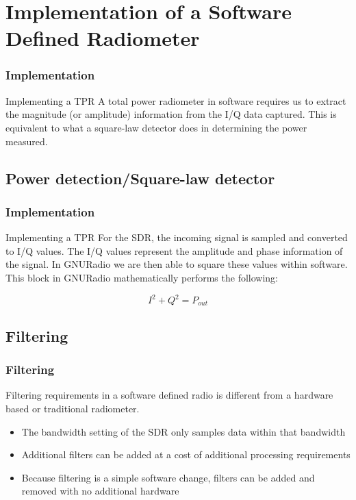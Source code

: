 \documentclass[notes]{beamer}
\begin{document}
\section{Implementation of a Software Defined Radiometer}
\begin{frame}
\frametitle{Implementation}
\begin{block}{Implementing a TPR}
A total power radiometer in software requires us to extract the magnitude (or amplitude) information from the I/Q data captured.  This is equivalent to what a square-law detector does in determining the power measured.
\end{block}
\end{frame}
\subsection{Power detection/Square-law detector}
\begin{frame}
\frametitle{Implementation}
\begin{block}{Implementing a TPR}
For the SDR, the incoming signal is sampled and converted to I/Q values.  The I/Q values represent the amplitude and phase information of the signal.  In GNURadio we are then able to square these values within software.  This block in GNURadio mathematically performs the following:

\begin{equation}\label{sumIQ}
I^2+Q^2 = P_{out}
\end{equation}
\end{block}
\end{frame}
\subsection{Filtering}
\begin{frame}
\frametitle{Filtering}
Filtering requirements in a software defined radio is different from a hardware based or traditional radiometer.
\begin{itemize}
\item The bandwidth setting of the SDR only samples data within that bandwidth
\item Additional filters can be added at a cost of additional processing requirements
\item Because filtering is a simple software change, filters can be added and removed with no additional hardware
\end{itemize}

\end{frame}
\end{document}
